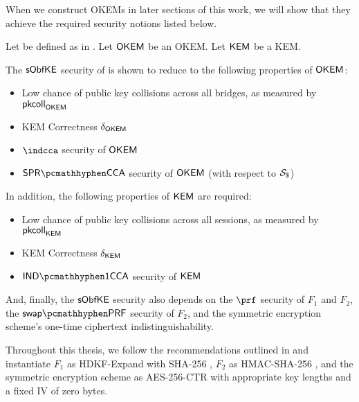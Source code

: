 When we construct OKEMs in later sections of this work, we will show that they achieve the required security notions listed below.

\begin{theorem}
\label{thm:drivel-security}
    Let \drivel{} be defined as in \cite[Fig.~6]{EPRINT:GRSV25}. Let $\mathsf{OKEM}$ be an OKEM. Let $\mathsf{KEM}$ be a KEM.
    
    The $\mathsf{sObfKE}$ security of \drivel{} is shown to reduce to the following properties of $\mathsf{OKEM}$:
    \begin{itemize}
        \item Low chance of public key collisions across all bridges, as measured by $\mathsf{pkcoll}_{\mathsf{OKEM}}$
        \item KEM Correctness $\delta_{\mathsf{OKEM}}$
        \item $\indcca$ security of $\mathsf{OKEM}$
        \item $\sprcca$ security of $\mathsf{OKEM}$ (with respect to $\simulbin$)
    \end{itemize}

    In addition, the following properties of $\mathsf{KEM}$ are required:
    \begin{itemize}
        \item Low chance of public key collisions across all sessions, as measured by $\mathsf{pkcoll}_{\mathsf{KEM}}$
        \item KEM Correctness $\delta_{\mathsf{KEM}}$
        \item $\indonecca$ security of $\mathsf{KEM}$
    \end{itemize}

    And, finally, the $\mathsf{sObfKE}$ security also depends on the $\prf$ security of $F_1$ and $F_2$, the $\swapprf$ security of $F_2$, and the symmetric encryption scheme's one-time ciphertext indistinguishability.    
\end{theorem}

Throughout this thesis, we follow the recommendations outlined in \cite[Section~4.2]{EPRINT:GRSV25} and instantiate $F_1$ as \textsf{HDKF-Expand} with \textsf{SHA-256} \cite{C:Krawczyk10,rfc5869}, $F_2$ as \textsf{HMAC-SHA-256} \cite{C:BelCanKra96,KraBelCan97}, and the symmetric encryption scheme as AES-256-CTR with appropriate key lengths and a fixed IV of zero bytes.

